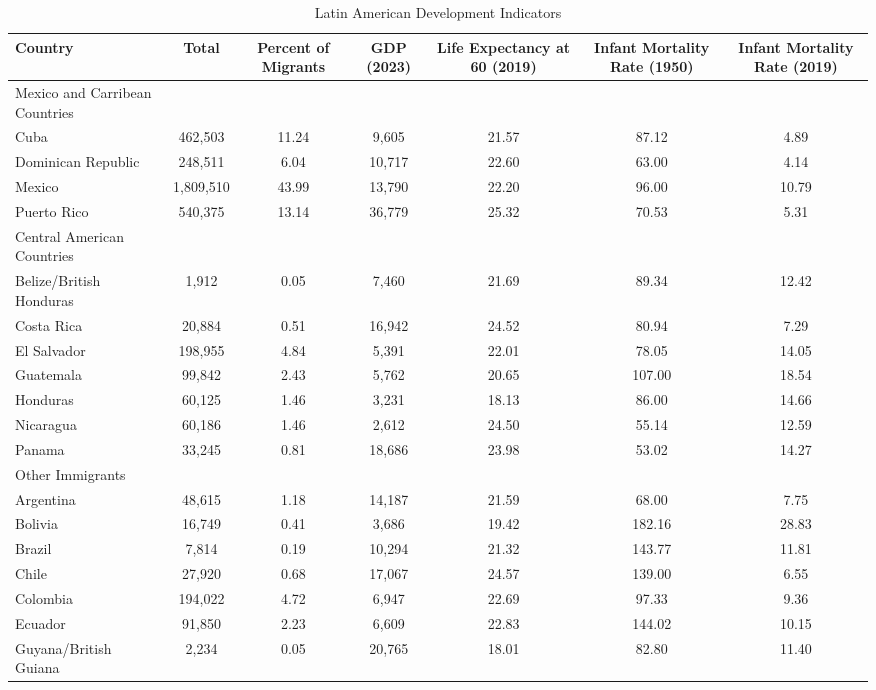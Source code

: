 \begin{table}[ht]
\centering
\caption{Latin American Development Indicators} 
\begin{tabular}{l|cccccc}
  \hline
Country & Total & Percent of Migrants & GDP (2023) & Life Expectancy at 60 (2019) & Infant Mortality Rate (1950) & Infant Mortality Rate (2019) \\ 
  \hline
Mexico and Carribean Countries &  &  &  &  &  &  \\ 
  Cuba & 462,503 & 11.24 & 9,605 & 21.57 & 87.12 & 4.89 \\ 
  Dominican Republic & 248,511 & 6.04 & 10,717 & 22.60 & 63.00 & 4.14 \\ 
  Mexico & 1,809,510 & 43.99 & 13,790 & 22.20 & 96.00 & 10.79 \\ 
  Puerto Rico & 540,375 & 13.14 & 36,779 & 25.32 & 70.53 & 5.31 \\ 
Central American Countries &  &  &  &  &  &  \\ 
  Belize/British Honduras & 1,912 & 0.05 & 7,460 & 21.69 & 89.34 & 12.42 \\ 
  Costa Rica & 20,884 & 0.51 & 16,942 & 24.52 & 80.94 & 7.29 \\ 
  El Salvador & 198,955 & 4.84 & 5,391 & 22.01 & 78.05 & 14.05 \\ 
  Guatemala & 99,842 & 2.43 & 5,762 & 20.65 & 107.00 & 18.54 \\
  Honduras & 60,125 & 1.46 & 3,231 & 18.13 & 86.00 & 14.66 \\ 
  Nicaragua & 60,186 & 1.46 & 2,612 & 24.50 & 55.14 & 12.59 \\ 
  Panama & 33,245 & 0.81 & 18,686 & 23.98 & 53.02 & 14.27 \\ 
Other Immigrants &  &  &  &  &  &  \\ 
  Argentina & 48,615 & 1.18 & 14,187 & 21.59 & 68.00 & 7.75 \\ 
  Bolivia & 16,749 & 0.41 & 3,686 & 19.42 & 182.16 & 28.83 \\ 
  Brazil & 7,814 & 0.19 & 10,294 & 21.32 & 143.77 & 11.81 \\ 
  Chile & 27,920 & 0.68 & 17,067 & 24.57 & 139.00 & 6.55 \\ 
  Colombia & 194,022 & 4.72 & 6,947 & 22.69 & 97.33 & 9.36 \\ 
  Ecuador & 91,850 & 2.23 & 6,609 & 22.83 & 144.02 & 10.15 \\ 
  Guyana/British Guiana & 2,234 & 0.05 & 20,765 & 18.01 & 82.80 & 11.40 \\ 

\end{tabular}
\end{table}
